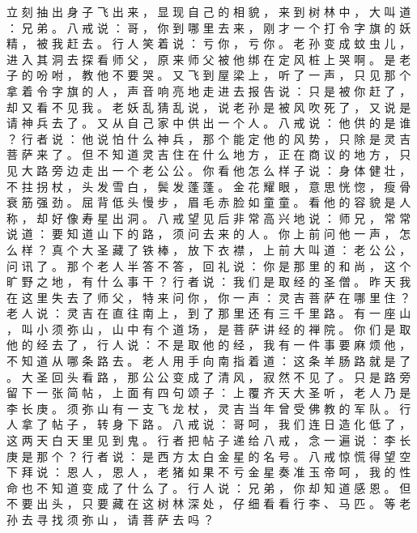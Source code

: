 {立 刻 抽 出 身 子 飞 出 来 ， 显 现 自 己 的 相 貌 ， 来 到 树 林 中 ， 大 叫 道 ： 兄 弟 。
八 戒 说 ： 哥 ， 你 到 哪 里 去 来 ， 刚 才 一 个 打 令 字 旗 的 妖 精 ， 被 我 赶 去 。
行 人 笑 着 说 ： 亏 你 ， 亏 你 。
老 孙 变 成 蚊 虫 儿 ， 进 入 其 洞 去 探 看 师 父 ， 原 来 师 父 被 他 绑 在 定 风 桩 上 哭 啊 。
是 老 子 的 吩 咐 ， 教 他 不 要 哭 。
又 飞 到 屋 梁 上 ， 听 了 一 声 ， 只 见 那 个 拿 着 令 字 旗 的 人 ， 声 音 响 亮 地 走 进 去 报 告 说 ： 只 是 被 你 赶 了 ， 却 又 看 不 见 我 。
老 妖 乱 猜 乱 说 ， 说 老 孙 是 被 风 吹 死 了 ， 又 说 是 请 神 兵 去 了 。
又 从 自 己 家 中 供 出 一 个 人 。
八 戒 说 ： 他 供 的 是 谁 ？ 行 者 说 ： 他 说 怕 什 么 神 兵 ， 那 个 能 定 他 的 风 势 ， 只 除 是 灵 吉 菩 萨 来 了 。
但 不 知 道 灵 吉 住 在 什 么 地 方 ， 正 在 商 议 的 地 方 ， 只 见 大 路 旁 边 走 出 一 个 老 公 公 。
你 看 他 怎 么 样 子 说 ： 身 体 健 壮 ， 不 拄 拐 杖 ， 头 发 雪 白 ， 鬓 发 蓬 蓬 。
金 花 耀 眼 ， 意 思 恍 惚 ， 瘦 骨 衰 筋 强 劲 。
屈 背 低 头 慢 步 ， 眉 毛 赤 脸 如 童 童 。
看 他 的 容 貌 是 人 称 ， 却 好 像 寿 星 出 洞 。
八 戒 望 见 后 非 常 高 兴 地 说 ： 师 兄 ， 常 常 说 道 ： 要 知 道 山 下 的 路 ， 须 问 去 来 的 人 。
你 上 前 问 他 一 声 ， 怎 么 样 ？ 真 个 大 圣 藏 了 铁 棒 ， 放 下 衣 襟 ， 上 前 大 叫 道 ： 老 公 公 ， 问 讯 了 。
那 个 老 人 半 答 不 答 ， 回 礼 说 ： 你 是 那 里 的 和 尚 ， 这 个 旷 野 之 地 ， 有 什 么 事 干 ？ 行 者 说 ： 我 们 是 取 经 的 圣 僧 。
昨 天 我 在 这 里 失 去 了 师 父 ， 特 来 问 你 ， 你 一 声 ： 灵 吉 菩 萨 在 哪 里 住 ？ 老 人 说 ： 灵 吉 在 直 往 南 上 ， 到 了 那 里 还 有 三 千 里 路 。
有 一 座 山 ， 叫 小 须 弥 山 ， 山 中 有 个 道 场 ， 是 菩 萨 讲 经 的 禅 院 。
你 们 是 取 他 的 经 去 了 ， 行 人 说 ： 不 是 取 他 的 经 ， 我 有 一 件 事 要 麻 烦 他 ， 不 知 道 从 哪 条 路 去 。
老 人 用 手 向 南 指 着 道 ： 这 条 羊 肠 路 就 是 了 。
大 圣 回 头 看 路 ， 那 公 公 变 成 了 清 风 ， 寂 然 不 见 了 。
只 是 路 旁 留 下 一 张 简 帖 ， 上 面 有 四 句 颂 子 ： 上 覆 齐 天 大 圣 听 ， 老 人 乃 是 李 长 庚 。
须 弥 山 有 一 支 飞 龙 杖 ， 灵 吉 当 年 曾 受 佛 教 的 军 队 。
行 人 拿 了 帖 子 ， 转 身 下 路 。
八 戒 说 ： 哥 呵 ， 我 们 连 日 造 化 低 了 ， 这 两 天 白 天 里 见 到 鬼 。
行 者 把 帖 子 递 给 八 戒 ， 念 一 遍 说 ： 李 长 庚 是 那 个 ？ 行 者 说 ： 是 西 方 太 白 金 星 的 名 号 。
八 戒 惊 慌 得 望 空 下 拜 说 ： 恩 人 ， 恩 人 ， 老 猪 如 果 不 亏 金 星 奏 准 玉 帝 呵 ， 我 的 性 命 也 不 知 道 变 成 了 什 么 了 。
行 人 说 ： 兄 弟 ， 你 却 知 道 感 恩 。
但 不 要 出 头 ， 只 要 藏 在 这 树 林 深 处 ， 仔 细 看 看 行 李 、 马 匹 。
等 老 孙 去 寻 找 须 弥 山 ， 请 菩 萨 去 吗 ？
}
